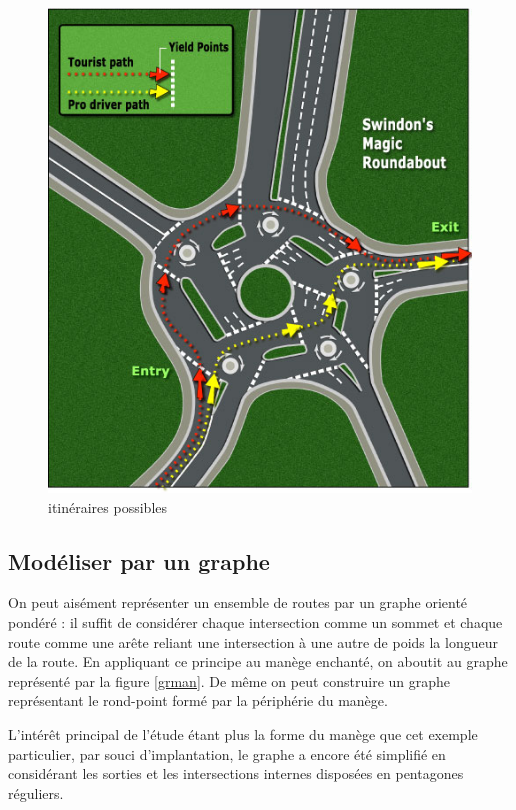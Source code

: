 \documentclass[11pt]{article}
\begin{document}
\begin{figure}
		\begin{center}
			\includegraphics[scale=0.3]{images/itin}
			\caption{\label{itin} itinéraires possibles}
		\end{center}
	\end{figure}


	\subsection{Modéliser par un graphe}

On peut aisément représenter un ensemble de routes par un graphe orienté pondéré : il suffit de considérer chaque intersection comme un sommet et chaque route comme une arête reliant une intersection à une autre de poids la longueur de la route. En appliquant ce principe au manège enchanté, on aboutit au graphe représenté par la figure \ref{grman}. De même on peut construire un graphe représentant le rond-point formé par la périphérie du manège. \par
L'intérêt principal de l'étude étant plus la forme du manège que cet exemple particulier, par souci d'implantation, le graphe a encore été simplifié en considérant les sorties et les intersections internes disposées en pentagones réguliers.
\end{document}
